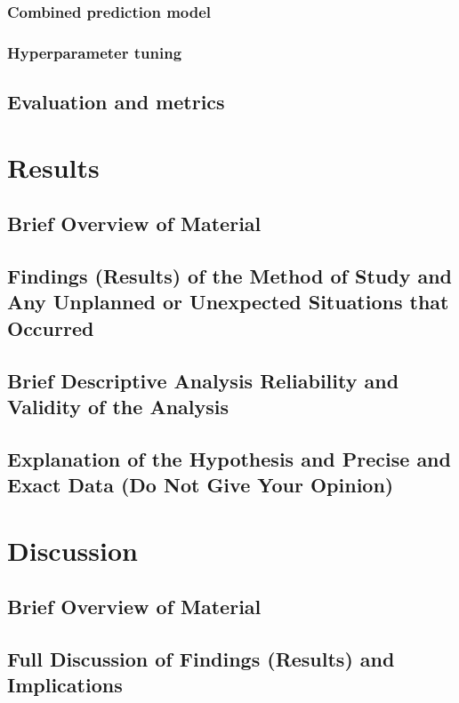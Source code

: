 \documentclass[]{article}
\begin{document}
\subsubsection{Combined prediction model}

\subsubsection{Hyperparameter tuning}

\subsection{Evaluation and metrics}

\section{Results}

\subsection*{Brief Overview of Material}
\subsection*{Findings (Results) of the Method of Study and Any Unplanned or Unexpected Situations that Occurred}
\subsection*{Brief Descriptive Analysis
Reliability and Validity of the Analysis}
\subsection*{Explanation of the Hypothesis and Precise and Exact Data (Do Not Give Your Opinion)}


\section{Discussion}

\subsection*{Brief Overview of Material}
\subsection*{Full Discussion of Findings (Results) and Implications}
\end{document}
